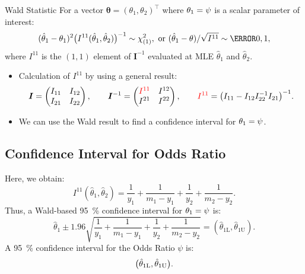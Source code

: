 \documentclass{article}\usepackage[]{graphicx}\usepackage[svgnames]{xcolor}
\let\exp\relax%
\let\log\relax%
\providecommand{\Vector}[1]{\bm{#1}}%
\providecommand{\Matrix}[1]{\bm{#1}}
\begin{document}
\begin{Regular}{Wald Statistic}
    For a vector $ \Vector{\theta}=(\theta_1,\theta_2)^\top $ where $ \theta_1=\log{\psi} $ is a scalar parameter of interest:
    \[ (\hat{\theta}_1-\theta_1)^2\bigl(I^{11}(\hat{\theta}_1,\hat{\theta}_2)\bigr)^{-1}\sim \chi^2_{(1)},
        \text{ or }(\hat{\theta}_1-\theta)/\sqrt{I^{11}} \sim \N{0,1}, \]
    where $ I^{11} $ is the $ (1,1) $ element of $ \Matrix{I}^{-1} $ evaluated at MLE $ \hat{\theta}_1 $ and $ \hat{\theta}_2 $.
\end{Regular}
\begin{itemize}
    \item Calculation of $ I^{11} $ by using a general result:
          \[ \Matrix{I}=\begin{pmatrix}
                  I_{11} & I_{12} \\
                  I_{21} & I_{22}
              \end{pmatrix},\qquad \Matrix{I}^{-1}=\begin{pmatrix}
                  \textcolor{Red}{I^{11}} & I^{12} \\
                  I^{21}                  & I^{22}
              \end{pmatrix},\qquad \textcolor{Red}{I^{11}}=\bigl(I_{11}-I_{12}I_{22}^{-1}I_{21}\bigr)^{-1}. \]
    \item We can use the Wald result to find a confidence interval for $ \theta_1=\log{\psi} $.
\end{itemize}
\subsection*{Confidence Interval for Odds Ratio}
Here, we obtain:
\[ I^{11}(\hat{\theta}_1,\hat{\theta}_2)=\frac{1}{y_1} +\frac{1}{m_1-y_1}+\frac{1}{y_2}+\frac{1}{m_2-y_2}. \]
Thus, a Wald-based \qty{95}{\percent} confidence interval for $ \theta_1=\log{\psi} $ is:
\[ \hat{\theta}_1\pm 1.96\sqrt{\frac{1}{y_1} +\frac{1}{m_1-y_1} +\frac{1}{y_2} +\frac{1}{m_2-y_2}}=(\hat{\theta}_{1\text{L}},\hat{\theta}_{1\text{U}}). \]
A \qty{95}{\percent} confidence interval for the Odds Ratio $ \psi $ is:
\[ \bigl(\exp{\hat{\theta}_{1\text{L}}},\exp{\hat{\theta}_{1\text{U}}}\bigr). \]
\end{document}
